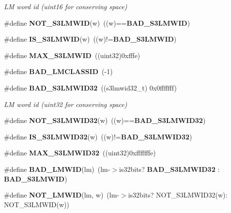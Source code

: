 \begin{DoxyCompactItemize}
\begin{DoxyCompactList}\small\item\em L\-M word id (uint16 for conserving space) \end{DoxyCompactList}\item 
\#define {\bfseries N\-O\-T\-\_\-\-S3\-L\-M\-W\-I\-D}(w)~((w)=={\bf B\-A\-D\-\_\-\-S3\-L\-M\-W\-I\-D})\label{s3types_8h_af536b75f1ecf7640b16c92d9a4903a66}

\item 
\#define {\bfseries I\-S\-\_\-\-S3\-L\-M\-W\-I\-D}(w)~((w)!={\bf B\-A\-D\-\_\-\-S3\-L\-M\-W\-I\-D})\label{s3types_8h_a53085819a64792f7442b64f4a85b458e}

\item 
\#define {\bfseries M\-A\-X\-\_\-\-S3\-L\-M\-W\-I\-D}~((uint32)0xfffe)\label{s3types_8h_a7cec519530089c34bae08704d2070b14}

\item 
\#define {\bfseries B\-A\-D\-\_\-\-L\-M\-C\-L\-A\-S\-S\-I\-D}~(-\/1)\label{s3types_8h_a0b572de40fa56a1aef9d435112659080}

\item 
\#define {\bf B\-A\-D\-\_\-\-S3\-L\-M\-W\-I\-D32}~((s3lmwid32\-\_\-t) 0x0fffffff)\label{s3types_8h_acdff89ca855bd57f8b8a07e18c8f9bb8}

\begin{DoxyCompactList}\small\item\em L\-M word id (uint32 for conserving space) \end{DoxyCompactList}\item 
\#define {\bfseries N\-O\-T\-\_\-\-S3\-L\-M\-W\-I\-D32}(w)~((w)=={\bf B\-A\-D\-\_\-\-S3\-L\-M\-W\-I\-D32})\label{s3types_8h_a4d01f032e1b34f0804987af14ea08fba}

\item 
\#define {\bfseries I\-S\-\_\-\-S3\-L\-M\-W\-I\-D32}(w)~((w)!={\bf B\-A\-D\-\_\-\-S3\-L\-M\-W\-I\-D32})\label{s3types_8h_acb7fd59ff9048383d349f7f95f636830}

\item 
\#define {\bfseries M\-A\-X\-\_\-\-S3\-L\-M\-W\-I\-D32}~((uint32)0xfffffffe)\label{s3types_8h_a163d1619c71a872c4ebfd839cf67c60e}

\item 
\#define {\bfseries B\-A\-D\-\_\-\-L\-M\-W\-I\-D}(lm)~(lm-\/$>$is32bits? {\bf B\-A\-D\-\_\-\-S3\-L\-M\-W\-I\-D32} \-: {\bf B\-A\-D\-\_\-\-S3\-L\-M\-W\-I\-D})\label{s3types_8h_ac84f2f2a422b294d90458b5330604ce3}

\item 
\#define {\bfseries N\-O\-T\-\_\-\-L\-M\-W\-I\-D}(lm, w)~(lm-\/$>$is32bits? N\-O\-T\-\_\-\-S3\-L\-M\-W\-I\-D32(w)\-: N\-O\-T\-\_\-\-S3\-L\-M\-W\-I\-D(w))\label{s3types_8h_ac880fc8b5db83b81513b43ec8db121e0}


\end{DoxyCompactItemize}
